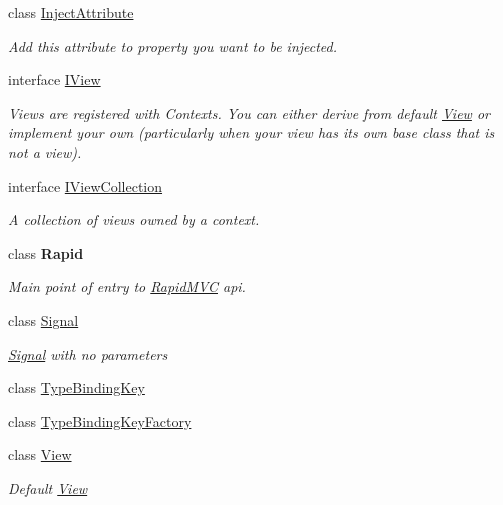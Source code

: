 \begin{DoxyCompactItemize}
\item 
class \mbox{\hyperlink{classcp_games_1_1core_1_1_rapid_m_v_c_1_1_inject_attribute}{Inject\+Attribute}}
\begin{DoxyCompactList}\small\item\em Add this attribute to property you want to be injected. \end{DoxyCompactList}\item 
interface \mbox{\hyperlink{interfacecp_games_1_1core_1_1_rapid_m_v_c_1_1_i_view}{I\+View}}
\begin{DoxyCompactList}\small\item\em Views are registered with Contexts. You can either derive from default \mbox{\hyperlink{classcp_games_1_1core_1_1_rapid_m_v_c_1_1_view}{View}} or implement your own (particularly when your view has its own base class that is not a view). \end{DoxyCompactList}\item 
interface \mbox{\hyperlink{interfacecp_games_1_1core_1_1_rapid_m_v_c_1_1_i_view_collection}{I\+View\+Collection}}
\begin{DoxyCompactList}\small\item\em A collection of views owned by a context. \end{DoxyCompactList}\item 
class {\bfseries Rapid}
\begin{DoxyCompactList}\small\item\em Main point of entry to \mbox{\hyperlink{namespacecp_games_1_1core_1_1_rapid_m_v_c}{Rapid\+M\+VC}} api. \end{DoxyCompactList}\item 
class \mbox{\hyperlink{classcp_games_1_1core_1_1_rapid_m_v_c_1_1_signal}{Signal}}
\begin{DoxyCompactList}\small\item\em \mbox{\hyperlink{classcp_games_1_1core_1_1_rapid_m_v_c_1_1_signal}{Signal}} with no parameters \end{DoxyCompactList}\item 
class \mbox{\hyperlink{classcp_games_1_1core_1_1_rapid_m_v_c_1_1_type_binding_key}{Type\+Binding\+Key}}
\item 
class \mbox{\hyperlink{classcp_games_1_1core_1_1_rapid_m_v_c_1_1_type_binding_key_factory}{Type\+Binding\+Key\+Factory}}
\item 
class \mbox{\hyperlink{classcp_games_1_1core_1_1_rapid_m_v_c_1_1_view}{View}}
\begin{DoxyCompactList}\small\item\em Default \mbox{\hyperlink{classcp_games_1_1core_1_1_rapid_m_v_c_1_1_view}{View}} \end{DoxyCompactList}\end{DoxyCompactItemize}
